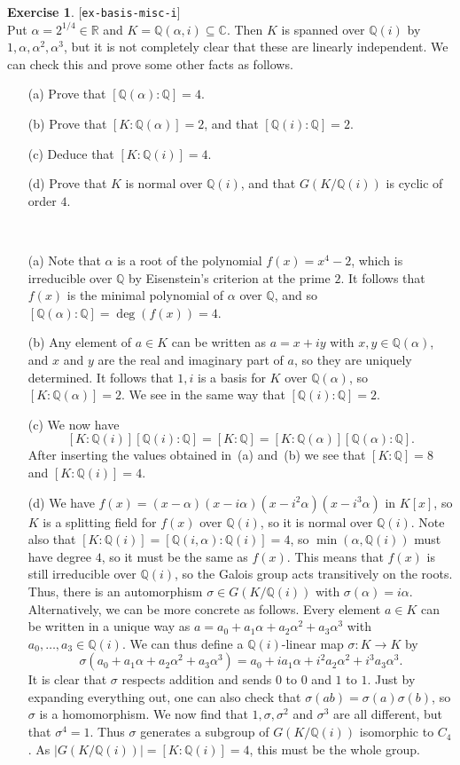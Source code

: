 \documentclass{amsart}
\newcommand{\Q}         {{\mathbb{Q}}}
\newcommand{\R}         {{\mathbb{R}}}
\newcommand{\C}         {{\mathbb{C}}}
\newcommand{\al}        {\alpha}
\newcommand{\sg}        {\sigma}
\newcommand{\sse}       {\subseteq}
\renewcommand{\:}{\colon}
\newcommand{\lastexlabel}{}
\newcommand{\exlabel}[1]{
 \global\def\lastexlabel{#1}\label{#1}[\texttt{#1}]\ \\
}
\newcommand{\exlabel}[1]{
 \global\def\lastexlabel{#1}\label{#1}
}
\newenvironment{solution}{\SolutionInline}{\endSolutionInline}
\theoremstyle{definition}
\newtheorem{exercise}{Exercise}[section]
\renewenvironment{solution}{\SolutionAtEnd}{\endSolutionAtEnd}
\begin{document}
\begin{exercise}\exlabel{ex-basis-misc-i}
 Put $\al=2^{1/4}\in\R$ and $K=\Q(\al,i)\sse\C$.  Then $K$ is spanned
 over $\Q(i)$ by $1,\al,\al^2,\al^3$, but it is not completely clear
 that these are linearly independent.  We can check this and prove
 some other facts as follows.
 \begin{itemize}
  \item[(a)] Prove that $[\Q(\al):\Q]=4$.
  \item[(b)] Prove that $[K:\Q(\al)]=2$, and that $[\Q(i):\Q]=2$.
  \item[(c)] Deduce that $[K:\Q(i)]=4$.
  \item[(d)] Prove that $K$ is normal over $\Q(i)$, and that
   $G(K/\Q(i))$ is cyclic of order $4$.
 \end{itemize}
\end{exercise}
\begin{solution}\ \\
 \begin{itemize}
  \item[(a)] Note that $\al$ is a root of the polynomial $f(x)=x^4-2$,
   which is irreducible over $\Q$ by Eisenstein's criterion at the prime $2$.
   It follows that $f(x)$ is the minimal polynomial of $\al$ over
   $\Q$, and so $[\Q(\al):\Q]=\deg(f(x))=4$.
  \item[(b)] Any element of $a\in K$ can be written as $a=x+iy$ with
   $x,y\in\Q(\al)$, and $x$ and $y$ are the real and imaginary part of
   $a$, so they are uniquely determined.  It follows that $1,i$ is a
   basis for $K$ over $\Q(\al)$, so $[K:\Q(\al)]=2$.  We see in the
   same way that $[\Q(i):\Q]=2$.
  \item[(c)] We now have 
   \[ [K:\Q(i)][\Q(i):\Q] = [K:\Q] = [K:\Q(\al)][\Q(\al):\Q]. \]
   After inserting the values obtained in~(a) and~(b) we see that
   $[K:\Q]=8$ and $[K:\Q(i)]=4$.
  \item[(d)] We have $f(x)=(x-\al)(x-i\al)(x-i^2\al)(x-i^3\al)$ in
   $K[x]$, so $K$ is a splitting field for $f(x)$ over $\Q(i)$, so it
   is normal over $\Q(i)$.  Note also that
   $[K:\Q(i)]=[\Q(i,\al):\Q(i)]=4$, so $\min(\al,\Q(i))$ must have
   degree $4$, so it must be the same as $f(x)$.  This means that
   $f(x)$ is still irreducible over $\Q(i)$, so the Galois group acts
   transitively on the roots.  Thus, there is an automorphism
   $\sg\in G(K/\Q(i))$ with $\sg(\al)=i\al$.  Alternatively, we can be
   more concrete as follows.  Every element $a\in K$ can be written in
   a  unique way as $a=a_0+a_1\al+a_2\al^2+a_3\al^3$ with
   $a_0,\dotsc,a_3\in\Q(i)$.  We can thus define a $\Q(i)$-linear map
   $\sg\:K\to K$ by 
   \[ \sg(a_0+a_1\al+a_2\al^2+a_3\al^3) = 
        a_0+ia_1\al+i^2a_2\al^2+i^3a_3\al^3.
   \]
   It is clear that $\sg$ respects addition and sends $0$ to $0$ and
   $1$ to $1$.  Just by expanding everything out, one can also check
   that $\sg(ab)=\sg(a)\sg(b)$, so $\sg$ is a homomorphism.  We now
   find that $1,\sg,\sg^2$ and $\sg^3$ are all different, but that
   $\sg^4=1$.  Thus $\sg$ generates a subgroup of $G(K/\Q(i))$
   isomorphic to $C_4$.  As $|G(K/\Q(i))|=[K:\Q(i)]=4$, this must be
   the whole group.
 \end{itemize}
\end{solution}
\end{document}
